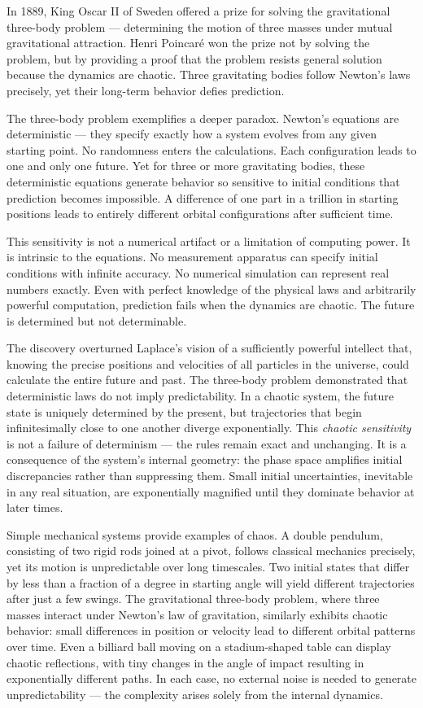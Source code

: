 In 1889, King Oscar II of Sweden offered a prize for solving the gravitational three-body problem — determining the motion of three masses under mutual gravitational attraction. Henri Poincaré won the prize not by solving the problem, but by providing a proof that the problem resists general solution because the dynamics are chaotic. Three gravitating bodies follow Newton's laws precisely, yet their long-term behavior defies prediction.

The three-body problem exemplifies a deeper paradox. Newton's equations are deterministic — they specify exactly how a system evolves from any given starting point. No randomness enters the calculations. Each configuration leads to one and only one future. Yet for three or more gravitating bodies, these deterministic equations generate behavior so sensitive to initial conditions that prediction becomes impossible. A difference of one part in a trillion in starting positions leads to entirely different orbital configurations after sufficient time.

This sensitivity is not a numerical artifact or a limitation of computing power. It is intrinsic to the equations. No measurement apparatus can specify initial conditions with infinite accuracy. No numerical simulation can represent real numbers exactly. Even with perfect knowledge of the physical laws and arbitrarily powerful computation, prediction fails when the dynamics are chaotic. The future is determined but not determinable.

The discovery overturned Laplace's vision of a sufficiently powerful intellect that, knowing the precise positions and velocities of all particles in the universe, could calculate the entire future and past. The three-body problem demonstrated that deterministic laws do not imply predictability. In a chaotic system, the future state is uniquely determined by the present, but trajectories that begin infinitesimally close to one another diverge exponentially. This \emph{chaotic sensitivity} is not a failure of determinism — the rules remain exact and unchanging. It is a consequence of the system's internal geometry: the phase space amplifies initial discrepancies rather than suppressing them. Small initial uncertainties, inevitable in any real situation, are exponentially magnified until they dominate behavior at later times.

Simple mechanical systems provide examples of chaos. A double pendulum, consisting of two rigid rods joined at a pivot, follows classical mechanics precisely, yet its motion is unpredictable over long timescales. Two initial states that differ by less than a fraction of a degree in starting angle will yield different trajectories after just a few swings. The gravitational three-body problem, where three masses interact under Newton's law of gravitation, similarly exhibits chaotic behavior: small differences in position or velocity lead to different orbital patterns over time. Even a billiard ball moving on a stadium-shaped table can display chaotic reflections, with tiny changes in the angle of impact resulting in exponentially different paths. In each case, no external noise is needed to generate unpredictability — the complexity arises solely from the internal dynamics.

